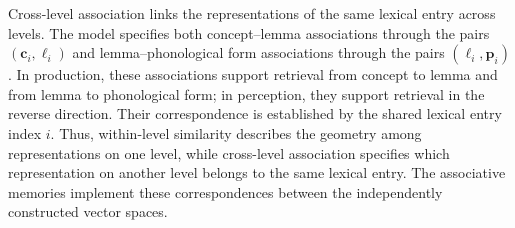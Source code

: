 Cross-level association links the representations of the same lexical entry across levels. The model specifies both concept--lemma associations through the pairs $(\mathbf c_i,\boldsymbol\ell_i)$ and lemma--phonological form associations through the pairs $(\boldsymbol\ell_i,\mathbf p_i)$. In production, these associations support retrieval from concept to lemma and from lemma to phonological form; in perception, they support retrieval in the reverse direction. Their correspondence is established by the shared lexical entry index $i$. Thus, within-level similarity describes the geometry among representations on one level, while cross-level association specifies which representation on another level belongs to the same lexical entry. The associative memories implement these correspondences between the independently constructed vector spaces.
